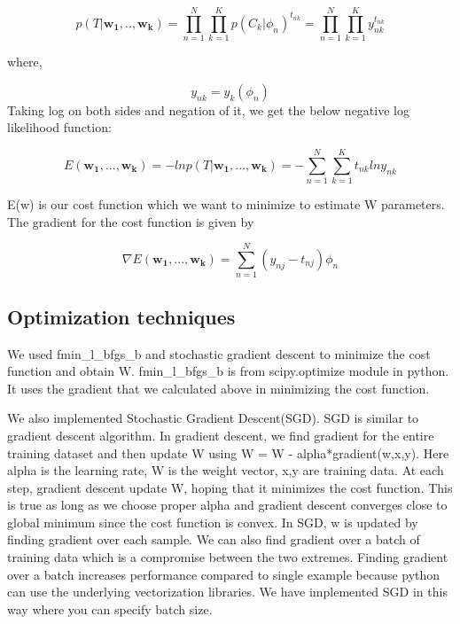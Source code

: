 \documentclass{article}
\begin{document}
\begin{equation}
p(T|\boldsymbol{w_{1},..,w_{k}}) = \prod\limits_{n=1}^N \prod\limits_{k=1}^K p(C_{k}|\phi_{n})^{t_{nk}} = \prod\limits_{n=1}^N \prod\limits_{k=1}^K y_{nk}^{t_{nk}}
\end{equation}

where,

\begin{equation}
y_{nk} = y_k(\phi_{n})
\end{equation}
Taking log on both sides
and negation of it, we get the below negative log likelihood
function:

\begin{equation}
E (\boldsymbol{w_{1}},..., \boldsymbol{w_{k}} ) = -ln p(T|\boldsymbol{w_{1}},...,\boldsymbol{w_{k}}) = - \sum\limits_{n=1}^N \sum\limits_{k=1}^K t_{nk} ln y_{nk}
\end{equation}

E(w) is our cost
function which we want to minimize to estimate W parameters.
The gradient for the cost function is given by

\begin{equation}
\nabla E (\boldsymbol{w_{1}},..., \boldsymbol{w_{k}} ) = \sum\limits_{n=1}^N(y_{nj} - t_{nj}) \phi_{n}
\end{equation}





\subsection{Optimization techniques}
We used fmin\_l\_bfgs\_b and stochastic gradient descent to minimize the cost function and obtain W. fmin\_l\_bfgs\_b is from scipy.optimize module in python. It uses the gradient that we calculated above in minimizing the cost function.

We also implemented Stochastic Gradient Descent(SGD). SGD is similar to gradient descent algorithm. In gradient descent, we find gradient for the entire training dataset and then update W using W = W - alpha*gradient(w,x,y). Here alpha is the learning rate, W is the weight vector, x,y are training data. At each step, gradient descent update W, hoping that it minimizes the cost function. This is true as long as we choose proper alpha and gradient descent converges close to global minimum since the cost function is convex. In SGD, w is updated by finding gradient over each sample. We can also find gradient over a batch of training data which is a compromise between the two extremes. Finding gradient over a batch increases performance compared to single example because python can use the underlying vectorization libraries. We have implemented SGD in this way where you can specify batch size.
\end{document}
